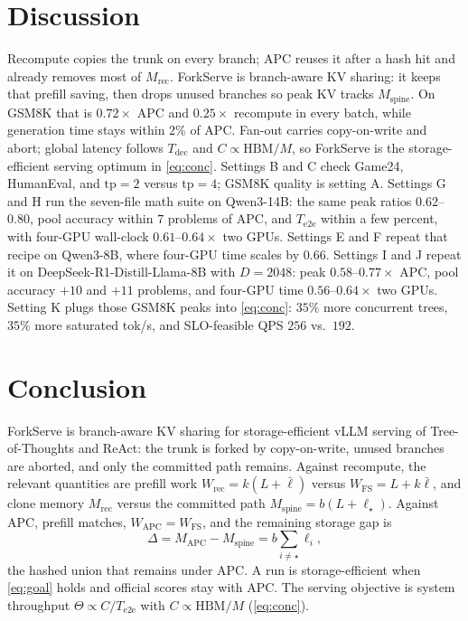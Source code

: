 \documentclass[11pt,a4paper]{article}
\begin{document}
\section{Discussion}

Recompute copies the trunk on every branch; APC reuses it after a hash hit and already removes most of $M_{\mathrm{rec}}$.
ForkServe is branch-aware KV sharing: it keeps that prefill saving, then drops unused branches so peak KV tracks $M_{\mathrm{spine}}$.
On GSM8K that is $0.72\times$ APC and $0.25\times$ recompute in every batch, while generation time stays within $2\%$ of APC.
Fan-out carries copy-on-write and abort; global latency follows $T_{\mathrm{dec}}$ and $C\propto\mathrm{HBM}/M$, so ForkServe is the storage-efficient serving optimum in \eqref{eq:conc}.
Settings B and C check Game24, HumanEval, and $\mathrm{tp}{=}2$ versus $\mathrm{tp}{=}4$; GSM8K quality is setting A.
Settings G and H run the seven-file math suite on Qwen3-14B: the same peak ratios $0.62$--$0.80$, pool accuracy within $7$ problems of APC, and $T_{\mathrm{e2e}}$ within a few percent, with four-GPU wall-clock $0.61$--$0.64\times$ two GPUs.
Settings E and F repeat that recipe on Qwen3-8B, where four-GPU time scales by $0.66$.
Settings I and J repeat it on DeepSeek-R1-Distill-Llama-8B with $D{=}2048$: peak $0.58$--$0.77\times$ APC, pool accuracy $+10$ and $+11$ problems, and four-GPU time $0.56$--$0.64\times$ two GPUs.
Setting K plugs those GSM8K peaks into \eqref{eq:conc}: $35\%$ more concurrent trees, $35\%$ more saturated tok/s, and SLO-feasible QPS $256$ vs.\ $192$.

\section{Conclusion}

ForkServe is branch-aware KV sharing for storage-efficient vLLM serving of Tree-of-Thoughts and ReAct: the trunk is forked by copy-on-write, unused branches are aborted, and only the committed path remains.
Against recompute, the relevant quantities are prefill work
$W_{\mathrm{rec}}=k(L+\bar\ell)$ versus $W_{\mathrm{FS}}=L+k\bar\ell$,
and clone memory $M_{\mathrm{rec}}$ versus the committed path $M_{\mathrm{spine}}=b(L+\ell_{\star})$.
Against APC, prefill matches, $W_{\mathrm{APC}}=W_{\mathrm{FS}}$, and the remaining storage gap is
\begin{equation}
\Delta = M_{\mathrm{APC}}-M_{\mathrm{spine}} = b\sum_{i\neq\star}\ell_i,
\end{equation}
the hashed union that remains under APC.
A run is storage-efficient when \eqref{eq:goal} holds and official scores stay with APC.
The serving objective is system throughput $\Theta\propto C/T_{\mathrm{e2e}}$ with $C\propto\mathrm{HBM}/M$ (\eqref{eq:conc}).
\end{document}
